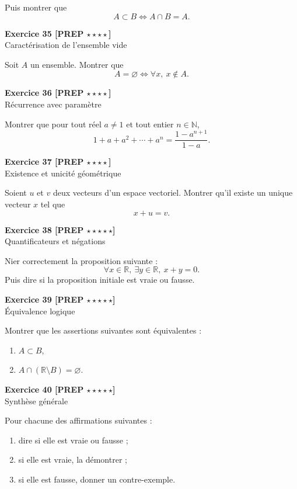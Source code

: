 \documentclass[11pt,a4paper]{article}
\newcommand{\R}{\mathbb{R}}
\newcommand{\N}{\mathbb{N}}
\begin{document}
Puis montrer que
\[
A\subset B \Longleftrightarrow A\cap B=A.
\]

\textbf{Exercice 35 [PREP \(\star\star\star\star\)]}\\
Caractérisation de l’ensemble vide

Soit \(A\) un ensemble. Montrer que
\[
A=\varnothing \Longleftrightarrow \forall x,\ x\notin A.
\]

\textbf{Exercice 36 [PREP \(\star\star\star\star\)]}\\
Récurrence avec paramètre

Montrer que pour tout réel \(a\neq 1\) et tout entier \(n\in\N\),
\[
1+a+a^2+\cdots+a^n=\frac{1-a^{n+1}}{1-a}.
\]

\textbf{Exercice 37 [PREP \(\star\star\star\star\)]}\\
Existence et unicité géométrique

Soient \(u\) et \(v\) deux vecteurs d’un espace vectoriel. Montrer qu’il existe un unique vecteur \(x\) tel que
\[
x+u=v.
\]

\textbf{Exercice 38 [PREP \(\star\star\star\star\star\)]}\\
Quantificateurs et négations

Nier correctement la proposition suivante :
\[
\forall x\in\R,\ \exists y\in\R,\ x+y=0.
\]
Puis dire si la proposition initiale est vraie ou fausse.

\textbf{Exercice 39 [PREP \(\star\star\star\star\star\)]}\\
Équivalence logique

Montrer que les assertions suivantes sont équivalentes :
\begin{enumerate}[label=\alph*)]
    \item \(A\subset B\),
    \item \(A\cap (\R\setminus B)=\varnothing\).
\end{enumerate}

\textbf{Exercice 40 [PREP \(\star\star\star\star\star\)]}\\
Synthèse générale

Pour chacune des affirmations suivantes :
\begin{enumerate}[label=\alph*)]
    \item dire si elle est vraie ou fausse ;
    \item si elle est vraie, la démontrer ;
    \item si elle est fausse, donner un contre-exemple.
\end{enumerate}
\end{document}
